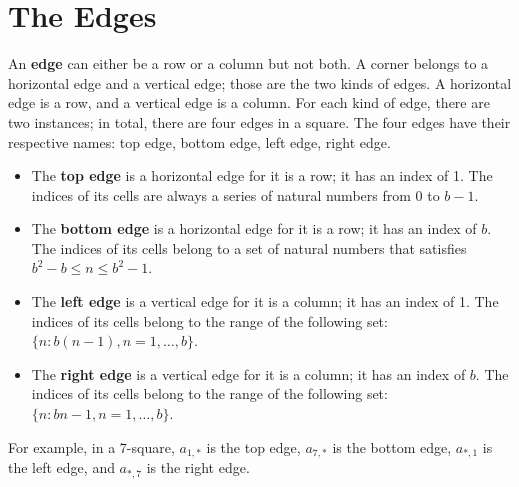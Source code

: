 \documentclass[twoside,openany,12pt]{book}
\begin{document}
    \section{The Edges} \label{edges}
    An \textbf{edge} can either be a row or a column but not both. A corner belongs to a horizontal edge and a vertical edge; those are the two kinds of edges. A horizontal edge is a row, and a vertical edge is a column. For each kind of edge, there are two instances; in total, there are four edges in a square. The four edges have their respective names: top edge, bottom edge, left edge, right edge.
    \begin{itemize}
        \item The \textbf{top edge} is a horizontal edge for it is a row; it has an index of 1. The indices of its cells are always a series of natural numbers from 0 to $b - 1$.
        \item The \textbf{bottom edge} is a horizontal edge for it is a row; it has an index of $b$. The indices of its cells belong to a set of natural numbers that satisfies $b^2 - b \leq n \leq b^2 - 1$.
        \item The \textbf{left edge} is a vertical edge for it is a column; it has an index of 1. The indices of its cells belong to the range of the following set: $\{n : b(n-1), n = 1,\dots,b\}$.
        \item The \textbf{right edge} is a vertical edge for it is a column; it has an index of $b$. The indices of its cells belong to the range of the following set: $\{n : bn-1, n = 1,\dots,b\}$.
    \end{itemize}

    For example, in a 7-square, $a_{1,*}$ is the top edge, $a_{7,*}$ is the bottom edge, $a_{*,1}$ is the left edge, and $a_{*,7}$ is the right edge.
\end{document}

